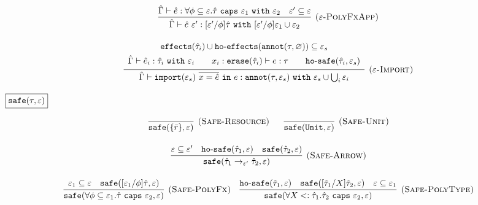 \documentclass{llncs}
\newcommand{\keywadj}[1]{\mathtt{#1}}
\newcommand{\keyw}[1]{\keywadj{#1}~}
\newcommand{\kw}[1]{\keyw{ #1 }}
\newcommand{\kwa}[1]{\keywadj{ #1 }}
\newcommand{\hyphen}{\hbox{-}}
\newcommand{\fx}[1]{ \kwa{effects}(#1) }
\newcommand{\hofx}[1]{ \kwa{ho \hyphen effects}(#1) }
\newcommand{\safe}[2]{ \kwa{safe}(#1, #2) }
\newcommand{\hosafe}[2]{ \kwa{ho \hyphen safe}(#1, #2) }
\newcommand{\annot}[2]{
	\keywadj{annot}(#1, #2)
}
\newcommand{\polycap}[3]{
	\forall #1. #2~ \kw{caps} #3
}
\newcommand{\ispoly}[1]{
	\kwa{is \hyphen poly}(#1)
}
\newcommand{\ub}[1]{
	\kwa{ub}(#1)
}
\begin{document}
\[\begin{array}{c}
\infer[\textsc{($\varepsilon$-PolyFxApp)}]
	{ \hat \Gamma \vdash \hat e~\varepsilon' : [\varepsilon'/\phi]\hat \tau~\kw{with} [\varepsilon'/\phi]\varepsilon_1 \cup \varepsilon_2 }
	{ \hat \Gamma \vdash \hat e: \polycap{\phi \subseteq \varepsilon}{\hat \tau}{\varepsilon_1}~\kw{with} \varepsilon_2 & \varepsilon' \subseteq \varepsilon } \\[2ex]

\infer[\textsc{($\varepsilon$-Import)}]
	{ \hat \Gamma \vdash \kwa{import}(\varepsilon_s)~\overline{x = \hat e}~\kw{in} e: \kwa{annot}(\tau, \varepsilon_s)~\kw{with} \varepsilon_s \cup \bigcup_{i} \varepsilon_i }
{{\def\arraystretch{1.4}
  \begin{array}{c}
\kwa{effects}(\hat \tau_i) \cup \hofx{\annot{\tau}{\varnothing}}\subseteq \varepsilon_s \\
\hat \Gamma \vdash \hat e_i: \hat \tau_i~\kw{with} \varepsilon_i  ~~~~~~ x_i: \kwa{erase}(\hat \tau_i) \vdash e: \tau ~~~~~~ \hosafe{\hat \tau_i}{\varepsilon_s}
  \end{array}}} 
 
 
\end{array}
\]





\noindent
$\fbox{$\kwa{safe(\tau, \varepsilon)}$}$

\[
\begin{array}{c}

\infer[\textsc{(Safe-Resource)}]
	{\kwa{safe}(\{ \bar r \}, \varepsilon)}
	{}
~~~~~
\infer[\textsc{(Safe-Unit)}]
	{\kwa{safe}(\kwa{Unit}, \varepsilon)}
	{} \\[3ex]

\infer[\textsc{(Safe-Arrow)}]
	{\kwa{safe}(\hat \tau_1 \rightarrow_{\varepsilon'} \hat \tau_2, \varepsilon)}
	{\varepsilon \subseteq \varepsilon' & \kwa{ho \hyphen safe}(\hat \tau_1, \varepsilon) & \kwa{safe}(\hat \tau_2, \varepsilon)} \\[3ex]

\infer[\textsc{(Safe-PolyFx)}]
	{\safe{\polycap{\phi \subseteq \varepsilon_1}{\hat \tau}{\varepsilon_2}}{\varepsilon}}
	{\varepsilon_1 \subseteq \varepsilon & \safe{[\varepsilon_1/\phi]\hat \tau}{\varepsilon}} ~~~

\infer[\textsc{(Safe-PolyType)}]
	{\safe{\polycap{X <: \hat \tau_1}{\hat \tau_2}{\varepsilon_2}}{\varepsilon}}
	{\hosafe{\hat \tau_1}{\varepsilon} & \safe{[\hat \tau_1/X]\hat \tau_2}{\varepsilon} & \varepsilon \subseteq \varepsilon_1}

\end{array}
\]
\end{document}
